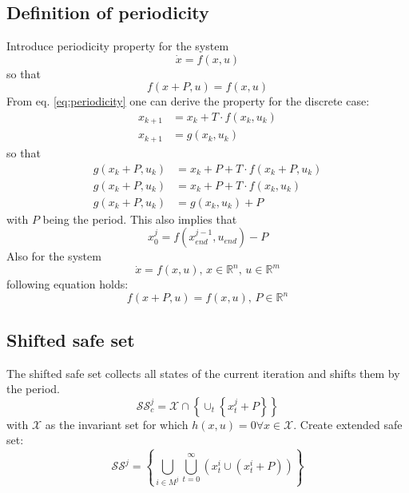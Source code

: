 \documentclass{article}
\begin{document}
\subsection{Definition of periodicity}
Introduce periodicity property for the system
\begin{equation}
\dot x = f(x,u)
\end{equation}
so that
\begin{equation}\label{eq:periodicity}
f(x+P,u) = f(x,u)
\end{equation}
From eq. \ref{eq:periodicity} one can derive the property for the discrete case:
\begin{align}
x_{k+1} &= x_k + T\cdot f(x_k,u_k)\\
x_{k+1} &= g(x_k,u_k)
\end{align}
so that
\begin{align}
g(x_k+P,u_k) &= x_k+P + T\cdot f(x_k+P,u_k)\\
g(x_k+P,u_k) &= x_k+P + T\cdot f(x_k,u_k)\\
g(x_k+P,u_k) &= g(x_k,u_k)+P
\end{align}
with $P$ being the period.
This also implies that
\begin{equation}
    x_0^j = f(x_{end}^{j-1},u_{end})-P
\end{equation}
Also for the system
\begin{equation}
\dot x = f(x,u) \text{, } x\in\mathbb{R}^n \text{, } u\in\mathbb{R}^m
\end{equation}
following equation holds:
\begin{equation}
f(x+P,u) = f(x,u) \text{, } P\in \mathbb{R}^n
\end{equation}
\subsection{Shifted safe set}
The shifted safe set collects all states of the current iteration and shifts them by the period.
\begin{equation}
    \mathcal{SS}_c^j = \mathcal{X}\cap \left\{\cup_t  \left\{x_t^j+P\right\}\right\}
\end{equation}
with $\mathcal{X}$ as the invariant set for which $h(x,u)=0 \forall x\in\mathcal{X}$.
Create extended safe set:
\[
\mathcal{SS}^j = \left\{ \bigcup_{i\in M^j} \bigcup_{t=0}^\infty \left(x_t^i\cup \left(x_t^i+P\right)\right)\right\}
\]
\end{document}
